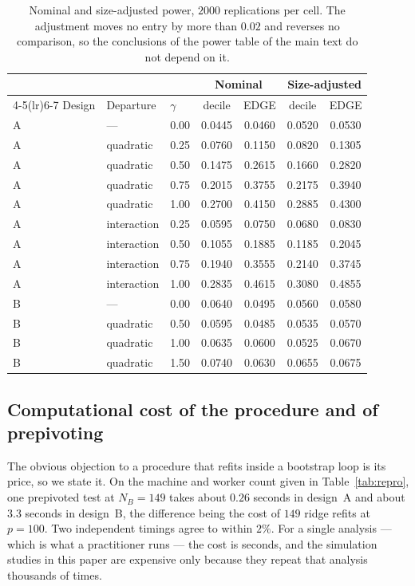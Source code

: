 \documentclass[11pt,a4paper]{article}
\theoremstyle{plain}
\theoremstyle{remark}
\begin{document}
\begin{table}[htbp]
\centering
\caption{Nominal and size-adjusted power, $2000$ replications per cell. The adjustment
moves no entry by more than $0.02$ and reverses no comparison, so the conclusions of
the power table of the main text do not depend on it.}
\label{tab:sizeadj}
\begin{tabular}{lllcccc}
\toprule
& & & \multicolumn{2}{c}{Nominal} & \multicolumn{2}{c}{Size-adjusted} \\
\cmidrule(lr){4-5}\cmidrule(lr){6-7}
Design & Departure & $\gamma$ & decile & EDGE & decile & EDGE \\
\midrule
A & ---         & 0.00 & 0.0445 & 0.0460 & 0.0520 & 0.0530 \\
A & quadratic   & 0.25 & 0.0760 & 0.1150 & 0.0820 & 0.1305 \\
A & quadratic   & 0.50 & 0.1475 & 0.2615 & 0.1660 & 0.2820 \\
A & quadratic   & 0.75 & 0.2015 & 0.3755 & 0.2175 & 0.3940 \\
A & quadratic   & 1.00 & 0.2700 & 0.4150 & 0.2885 & 0.4300 \\
A & interaction & 0.25 & 0.0595 & 0.0750 & 0.0680 & 0.0830 \\
A & interaction & 0.50 & 0.1055 & 0.1885 & 0.1185 & 0.2045 \\
A & interaction & 0.75 & 0.1940 & 0.3555 & 0.2140 & 0.3745 \\
A & interaction & 1.00 & 0.2835 & 0.4615 & 0.3080 & 0.4855 \\
\midrule
B & ---         & 0.00 & 0.0640 & 0.0495 & 0.0560 & 0.0580 \\
B & quadratic   & 0.50 & 0.0595 & 0.0485 & 0.0535 & 0.0570 \\
B & quadratic   & 1.00 & 0.0635 & 0.0600 & 0.0525 & 0.0670 \\
B & quadratic   & 1.50 & 0.0740 & 0.0630 & 0.0655 & 0.0675 \\
\bottomrule
\end{tabular}
\end{table}

\subsection{Computational cost of the procedure and of prepivoting}\label{sec:cost}

The obvious objection to a procedure that refits inside a bootstrap loop is its price, so
we state it. On the machine and worker count given in Table~\ref{tab:repro}, one
prepivoted test at $N_B = 149$ takes about $0.26$ seconds in design~A and about $3.3$
seconds in design~B, the difference being the cost of $149$ ridge refits at $p = 100$.
Two independent timings agree to within $2\%$. For a single analysis --- which is what a
practitioner runs --- the cost is seconds, and the simulation studies in this paper are
expensive only because they repeat that analysis thousands of times.
\end{document}
